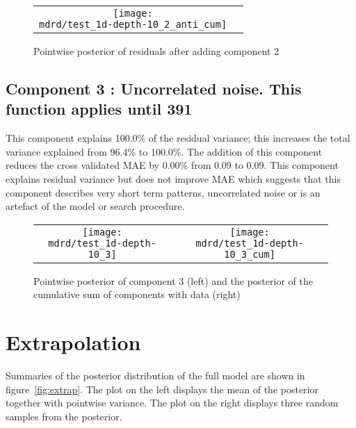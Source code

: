 \documentclass{article} %
\begin{document}
\begin{figure}[H]
\newcommand{\wmgd}{0.5\columnwidth}
\newcommand{\hmgd}{3.0cm}
\newcommand{\mdrd}{test_1d-depth-10}
\newcommand{\mbm}{\hspace{-0.3cm}}
\begin{tabular}{cc}
\mbm \texttt{[image: \\mdrd/test\_1d-depth-10\_2\_anti\_cum]}
\end{tabular}
\caption{Pointwise posterior of residuals after adding component 2}
\label{fig:comp2}
\end{figure}

\subsection{Component 3 : Uncorrelated noise. This function applies until  391}



This component explains 100.0\% of the residual variance; this increases the total variance explained from 96.4\% to 100.0\%.
The addition of this component reduces the cross validated MAE by 0.00\% from 0.09 to 0.09.
This component explains residual variance but does not improve MAE which suggests that this component describes very short term patterns, uncorrelated noise or is an artefact of the model or search procedure.

\begin{figure}[H]
\newcommand{\wmgd}{0.5\columnwidth}
\newcommand{\hmgd}{3.0cm}
\newcommand{\mdrd}{test_1d-depth-10}
\newcommand{\mbm}{\hspace{-0.3cm}}
\begin{tabular}{cc}
\mbm \texttt{[image: \\mdrd/test\_1d-depth-10\_3]} & \texttt{[image: \\mdrd/test\_1d-depth-10\_3\_cum]}
\end{tabular}
\caption{Pointwise posterior of component 3 (left) and the posterior of the cumulative sum of components with data (right)}
\label{fig:comp3}
\end{figure}

\section{Extrapolation}
\label{sec:extrap}

Summaries of the posterior distribution of the full model are shown in figure~\ref{fig:extrap}.
The plot on the left displays the mean of the posterior together with pointwise variance.
The plot on the right displays three random samples from the posterior.
\end{document}
